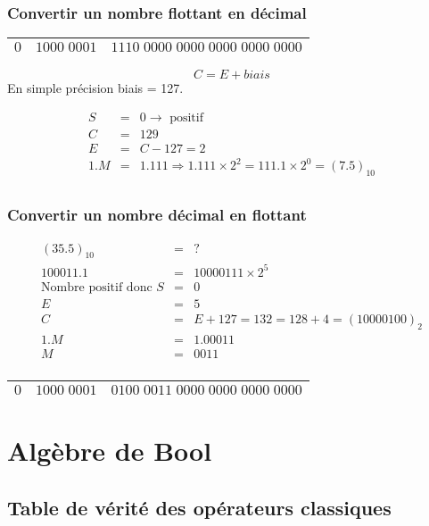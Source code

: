 \documentclass[12pt,a4paper,openany]{book}
\begin{document}
		\subsection{Convertir un nombre flottant en décimal}
		\begin{center}
			\begin{tabular}{|c|c|c|}
				\hline
				$0$ & $1000\; 0001$ & $1110\; 0000\; 0000\; 0000\; 0000\; 0000$\\
				\hline
			\end{tabular}
		\end{center}
	$$C = E + biais$$
	En simple précision biais = 127.

	\begin{eqnarray*}
		S &=& 0 \rightarrow \textrm{ positif}\\
		C &=& 129\\
		E &=& C - 127 = 2\\
		1.M &=& 1.111 \Rightarrow 1.111 \times 2^2 = 111.1 \times 2^0 = (7.5)_{10}\\
	\end{eqnarray*}
	\newpage	
	\subsection{Convertir un nombre décimal en flottant}
	\begin{eqnarray*}
		(35.5)_{10} &=& ? \\
		100011.1 &=& 10000111 \times 2^5\\
		\textrm{Nombre positif donc } S &=& 0\\
		E &=& 5\\
		C &=& E + 127 = 132 = 128+4 = (10000100)_2\\
		1.M &=& 1.00011\\
		M &=& 0011\\
	\end{eqnarray*}
	
		\begin{center}
			\begin{tabular}{|c|c|c|}
				\hline
				$0$ & $1000\; 0001$ & $0100\; 0011\; 0000\; 0000\; 0000\; 0000$\\
				\hline
			\end{tabular}
		\end{center}
		

		\chapter{Algèbre de Bool}
	\section{Table de vérité des opérateurs classiques}
\end{document}
